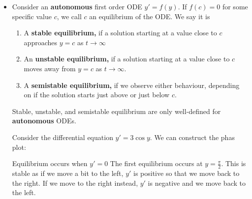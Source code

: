 \begin{itemize}
\begin{center}
          \end{center}
    \item Consider an \textbf{autonomous} first order ODE $y'=f(y)$. If $f(c)=0$ for some specific value $c$, we call $c$ an equilibrium of the ODE. We say it is
          \begin{enumerate}
              \item A \textbf{stable equilibrium,} if a solution starting at a value close to $c$ approaches $y=c$ as $t\rightarrow\infty$
              \item An \textbf{unstable equilibrium,} if a solution starting at a value close to $c$ moves away from $y=c$ as $t\rightarrow\infty$.
              \item A \textbf{semistable equilibrium,} if we observe either behaviour, depending on if the solution starts just above or just below $c$.
          \end{enumerate}
          \begin{warning}
            Stable, unstable, and semistable equilibrium are only well-defined for \textbf{autonomous} ODEs.
          \end{warning}
          \begin{example}
              Consider the differential equation $y'=3\cos y$. We can construct the phas plot:
              \begin{center}
              \end{center}
              Equilibrium occurs when $y'=0$ The first equilibrium occurs at $y=\frac{\pi}{2}$. This is stable as if we move a bit to the left, $y'$ is positive so that we move back to the right. If we move to the right instead, $y'$ is negative and we move back to the left.
              \vspace{2mm}


\end{example}
\end{itemize}
